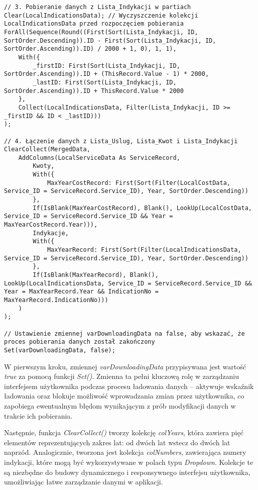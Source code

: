 \begin{lstlisting}[language=PowerFx]
// 3. Pobieranie danych z Lista_Indykacji w partiach
Clear(LocalIndicationsData); // Wyczyszczenie kolekcji LocalIndicationsData przed rozpoczęciem pobierania
ForAll(Sequence(Round((First(Sort(Lista_Indykacji, ID, SortOrder.Descending)).ID - First(Sort(Lista_Indykacji, ID, SortOrder.Ascending)).ID) / 2000 + 1, 0), 1, 1),
    With({
        _firstID: First(Sort(Lista_Indykacji, ID, SortOrder.Ascending)).ID + (ThisRecord.Value - 1) * 2000,
        _lastID: First(Sort(Lista_Indykacji, ID, SortOrder.Ascending)).ID + ThisRecord.Value * 2000
    },
    Collect(LocalIndicationsData, Filter(Lista_Indykacji, ID >= _firstID && ID < _lastID)))
);

// 4. Łączenie danych z Lista_Uslug, Lista_Kwot i Lista_Indykacji
ClearCollect(MergedData,
    AddColumns(LocalServiceData As ServiceRecord,
        Kwoty,
        With({
            MaxYearCostRecord: First(Sort(Filter(LocalCostData, Service_ID = ServiceRecord.Service_ID), Year, SortOrder.Descending))
        },
        If(IsBlank(MaxYearCostRecord), Blank(), LookUp(LocalCostData, Service_ID = ServiceRecord.Service_ID && Year = MaxYearCostRecord.Year))),
        Indykacje,
        With({
            MaxYearRecord: First(Sort(Filter(LocalIndicationsData, Service_ID = ServiceRecord.Service_ID), Year, SortOrder.Descending))
        },
        If(IsBlank(MaxYearRecord), Blank(), LookUp(LocalIndicationsData, Service_ID = ServiceRecord.Service_ID && Year = MaxYearRecord.Year && IndicationNo = MaxYearRecord.IndicationNo)))
    )
);

// Ustawienie zmiennej varDownloadingData na false, aby wskazać, że proces pobierania danych został zakończony
Set(varDownloadingData, false);
\end{lstlisting}

W pierwszym kroku, zmiennej \emph{varDownloadingData} przypisywana jest wartość \emph{true} za pomocą funkcji \emph{Set()}. Zmienna ta pełni kluczową rolę w zarządzaniu interfejsem użytkownika podczas procesu ładowania danych – aktywuje wskaźnik ładowania oraz blokuje możliwość wprowadzania zmian przez użytkownika, co zapobiega ewentualnym błędom wynikającym z prób modyfikacji danych w trakcie ich pobierania.

Następnie, funkcja \emph{ClearCollect()} tworzy kolekcję \emph{colYears}, która zawiera pięć elementów reprezentujących zakres lat: od dwóch lat wstecz do dwóch lat naprzód. Analogicznie, tworzona jest kolekcja \emph{colNumbers}, zawierająca numery indykacji, które mogą być wykorzystywane w polach typu \emph{Dropdown}. Kolekcje te są niezbędne do budowy dynamicznego i responsywnego interfejsu użytkownika, umożliwiając łatwe zarządzanie danymi w aplikacji.

